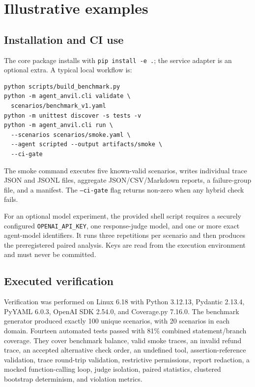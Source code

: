 \documentclass[preprint,12pt]{elsarticle}
\begin{document}
\section{Illustrative examples}

\subsection{Installation and CI use}

The core package installs with \texttt{pip install -e .}; the service adapter is an optional extra. A typical local workflow is:

\begin{verbatim}
python scripts/build_benchmark.py
python -m agent_anvil.cli validate \
  scenarios/benchmark_v1.yaml
python -m unittest discover -s tests -v
python -m agent_anvil.cli run \
  --scenarios scenarios/smoke.yaml \
  --agent scripted --output artifacts/smoke \
  --ci-gate
\end{verbatim}

The smoke command executes five known-valid scenarios, writes individual trace JSON and JSONL files, aggregate JSON/CSV/Markdown reports, a failure-group file, and a manifest. The \texttt{--ci-gate} flag returns non-zero when any hybrid check fails.

For an optional model experiment, the provided shell script requires a securely configured \texttt{OPENAI\_API\_KEY}, one response-judge model, and one or more exact agent-model identifiers. It runs three repetitions per scenario and then produces the preregistered paired analysis. Keys are read from the execution environment and must never be committed.

\subsection{Executed verification}

Verification was performed on Linux 6.18 with Python 3.12.13, Pydantic 2.13.4, PyYAML 6.0.3, OpenAI SDK 2.54.0, and Coverage.py 7.16.0. The benchmark generator produced exactly 100 unique scenarios, with 20 scenarios in each domain. Fourteen automated tests passed with 81\% combined statement/branch coverage. They cover benchmark balance, valid smoke traces, an invalid refund trace, an accepted alternative check order, an undefined tool, assertion-reference validation, trace round-trip validation, restrictive permissions, report redaction, a mocked function-calling loop, judge isolation, paired statistics, clustered bootstrap determinism, and violation metrics.
\end{document}
